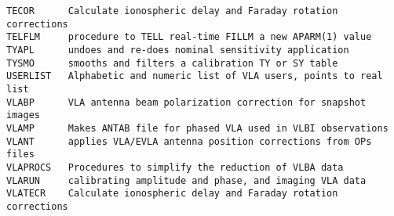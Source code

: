 \begin{verbatim}
TECOR      Calculate ionospheric delay and Faraday rotation corrections
TELFLM     procedure to TELL real-time FILLM a new APARM(1) value
TYAPL      undoes and re-does nominal sensitivity application
TYSMO      smooths and filters a calibration TY or SY table
USERLIST   Alphabetic and numeric list of VLA users, points to real list
VLABP      VLA antenna beam polarization correction for snapshot images
VLAMP      Makes ANTAB file for phased VLA used in VLBI observations
VLANT      applies VLA/EVLA antenna position corrections from OPs files
VLAPROCS   Procedures to simplify the reduction of VLBA data
VLARUN     calibrating amplitude and phase, and imaging VLA data
VLATECR    Calculate ionospheric delay and Faraday rotation corrections
\end{verbatim}\eve


